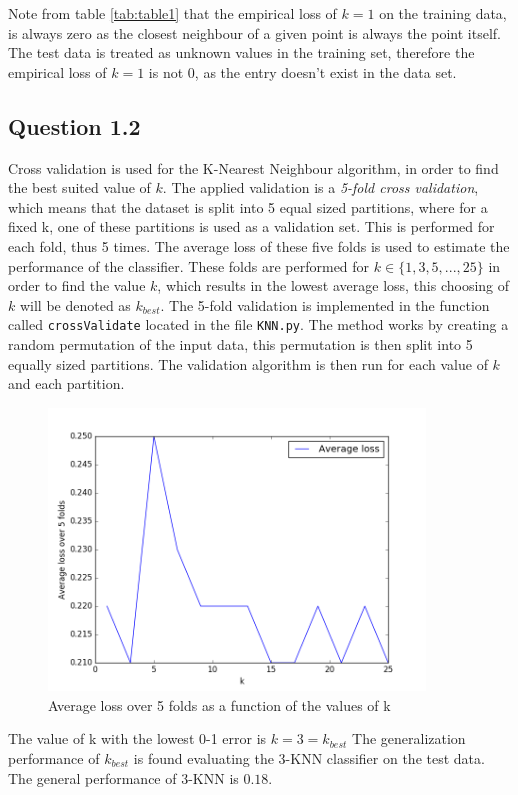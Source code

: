 \documentclass{article}
\begin{document}
Note from table \ref{tab:table1} that the empirical loss of $k=1$ on the training data, is always zero as the closest neighbour of a given point is always the point itself. The test data is treated as unknown values in the training set, therefore the empirical loss of $k=1$ is not 0, as the entry doesn't exist in the data set.
\subsection{Question 1.2}
Cross validation is used for the K-Nearest Neighbour algorithm, in order to find the best suited value of $k$. The applied validation is a \textit{5-fold cross validation}, which means that the dataset is split into 5 equal sized partitions, where for a fixed k, one of these partitions is used as a validation set. This is performed for each fold, thus 5 times. The average loss of these five folds is used to estimate the performance of the classifier. These folds are performed for $k \in \lbrace 1,3,5,...,25 \rbrace$ in order to find the value $k$, which results in the lowest average loss, this choosing of $k$ will be denoted as $k_{best}$.  
The 5-fold validation is implemented in the function called \texttt{crossValidate} located in the file \texttt{KNN.py}. The method works by creating a random permutation of the input data, this permutation is then split into 5 equally sized partitions. The validation algorithm is then run for each value of $k$ and each partition.
\begin{figure}[H]
  \centering
  \includegraphics[width=10cm]{ass1.png}
  \caption{Average loss over 5 folds as a function of the values of k}
  \label{fig:cross1}
\end{figure}
The value of k with the lowest 0-1 error is $k = 3 = k_{best}$
The generalization performance of $k_{best}$ is found evaluating the 3-KNN classifier on the test data. The general performance of 3-KNN is $0.18$.
\end{document}
